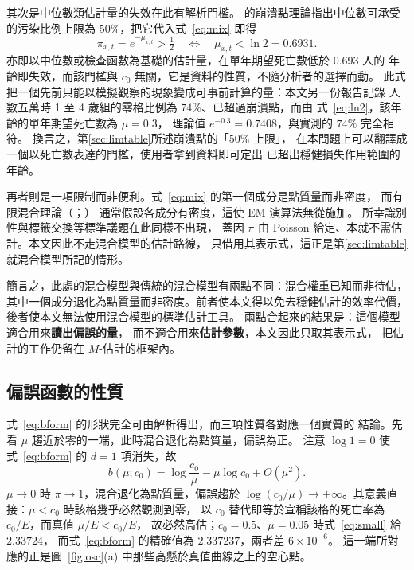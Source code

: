 \documentclass[UTF8, fontset=macnew, a4paper, 12pt]{ctexart}
\begin{document}
其次是中位數類估計量的失效在此有解析門檻。
\citet{donoho1983}的崩潰點理論指出中位數可承受的污染比例上限為
$50\%$，把它代入式~\eqref{eq:mix} 即得
\begin{equation}\label{eq:ln2}
\pi_{x,t}=e^{-\mu_{x,t}}>\tfrac12
\quad\Longleftrightarrow\quad
\mu_{x,t}<\ln 2=0.6931 .
\end{equation}
亦即以中位數或檢查函數為基礎的估計量，在單年期望死亡數低於 $0.693$ 人的
年齡即失效，而該門檻與 $c_0$ 無關，它是資料的性質，不隨分析者的選擇而動。
此式把一個先前只能以模擬觀察的現象變成可事前計算的量：本文另一份報告記錄
人數五萬時 1 至 4 歲組的零格比例為 $74\%$、已超過崩潰點，而由
式~\eqref{eq:ln2}，該年齡的單年期望死亡數為 $\mu=0.3$，
理論值 $e^{-0.3}=0.7408$，與實測的 $74\%$ 完全相符。
換言之，第\ref{sec:limtable}所述崩潰點的「$50\%$ 上限」，
在本問題上可以翻譯成一個以死亡數表達的門檻，使用者拿到資料即可定出
已超出穩健損失作用範圍的年齡。

再者則是一項限制而非便利。式~\eqref{eq:mix} 的第一個成分是點質量而非密度，
而有限混合理論（\citealp{mclachlan2000}；\citealp[§1.2]{yao2024}）
通常假設各成分有密度，這使 EM 演算法無從施加。
所幸識別性與標籤交換等標準議題在此同樣不出現，
蓋因 $\pi$ 由 Poisson 給定、本就不需估計。本文因此不走混合模型的估計路線，
只借用其表示式，這正是第\ref{sec:limtable}就混合模型所記的情形。

簡言之，此處的混合模型與傳統的混合模型有兩點不同：混合權重已知而非待估，
其中一個成分退化為點質量而非密度。前者使本文得以免去穩健估計的效率代價，
後者使本文無法使用混合模型的標準估計工具。
兩點合起來的結果是：這個模型適合用來\textbf{讀出偏誤的量}，
而不適合用來\textbf{估計參數}，本文因此只取其表示式，
把估計的工作仍留在 $M$-估計的框架內。

\subsection{偏誤函數的性質}

式~\eqref{eq:bform} 的形狀完全可由解析得出，而三項性質各對應一個實質的
結論。先看 $\mu$ 趨近於零的一端，此時混合退化為點質量，偏誤為正。
注意 $\log 1=0$ 使式~\eqref{eq:bform} 的 $d=1$ 項消失，故
\begin{equation}\label{eq:small}
b(\mu;c_0)=\log\frac{c_0}{\mu}-\mu\log c_0+O(\mu^2).
\end{equation}
$\mu\to0$ 時 $\pi\to1$，混合退化為點質量，偏誤趨於
$\log(c_0/\mu)\to+\infty$。其意義直接：$\mu<c_0$ 時該格幾乎必然觀測到零，
以 $c_0$ 替代即等於宣稱該格的死亡率為 $c_0/E$，而真值 $\mu/E<c_0/E$，
故必然高估；$c_0=0.5$、$\mu=0.05$ 時式~\eqref{eq:small} 給 $2.33724$，
而式~\eqref{eq:bform} 的精確值為 $2.337237$，兩者差 $6\times10^{-6}$。
這一端所對應的正是圖~\ref{fig:osc}(a) 中那些高懸於真值曲線之上的空心點。
\end{document}
